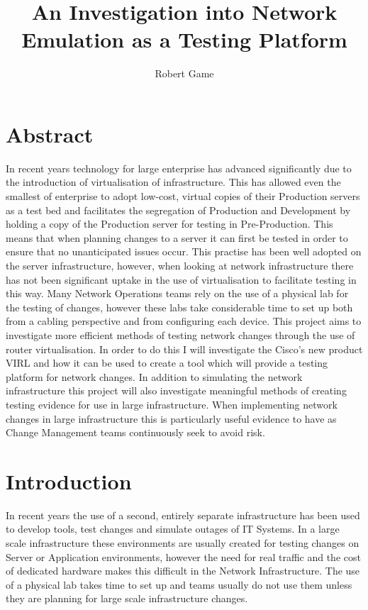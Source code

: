 \documentclass[11pt]{report}
\begin{document}
\title{An Investigation into Network Emulation as a Testing Platform}
\author{Robert Game}
\date{}
\maketitle

\chapter*{Abstract}

In recent years technology for large enterprise has advanced significantly due to the introduction of virtualisation of infrastructure. This has allowed even the smallest of enterprise to adopt low-cost, virtual copies of their Production servers as a test bed and facilitates the segregation of Production and Development by holding a copy of the Production server for testing in Pre-Production. This means that when planning changes to a server it can first be tested in order to ensure that no unanticipated issues occur. This practise has been well adopted on the server infrastructure, however, when looking at network infrastructure there has not been significant uptake in the use of virtualisation to facilitate testing in this way. Many Network Operations teams rely on the use of a physical lab for the testing of changes, however these labs take considerable time to set up both from a cabling perspective and from configuring each device. This project aims to investigate more efficient methods of testing network changes through the use of router virtualisation. In order to do this I will investigate the Cisco's new product VIRL and how it can be used to create a tool which will provide a testing platform for network changes. In addition to simulating the network infrastructure this project will also investigate meaningful methods of creating testing evidence for use in large infrastructure. When implementing network changes in large infrastructure this is particularly useful evidence to have as Change Management teams continuously seek to avoid risk.

\pagebreak

\tableofcontents

\chapter{Introduction}

In recent years the use of a second, entirely separate infrastructure has been used to develop tools, test changes and simulate outages of IT Systems. In a large scale infrastructure these environments are usually created for testing changes on Server or Application environments, however the need for real traffic and the cost of dedicated hardware makes this difficult in the Network Infrastructure. The use of a physical lab takes time to set up and teams usually do not use them unless they are planning for large scale infrastructure changes.
\end{document}
